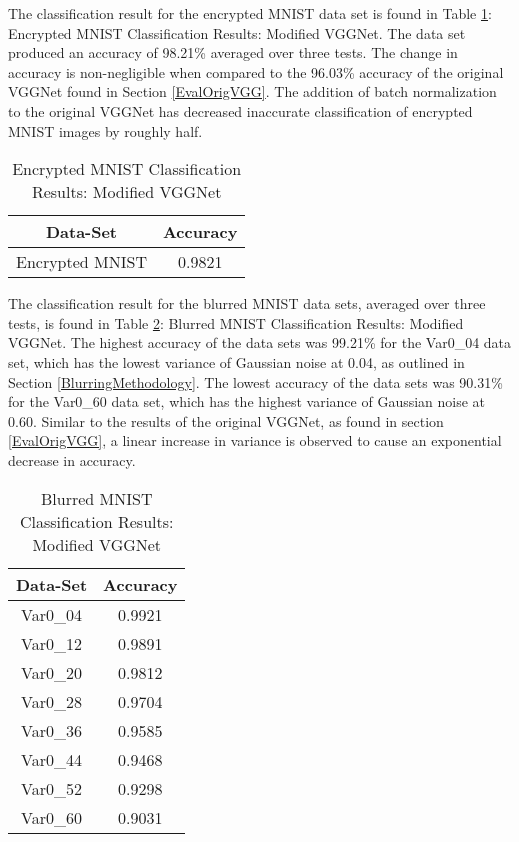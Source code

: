 \documentclass[12pt, titlepage]{article}
\begin{document}
\noindent The classification result for the encrypted MNIST data set is found in Table \ref{table:modVGG_Encryption}: Encrypted MNIST Classification Results: Modified VGGNet. The data set produced an accuracy of 98.21\% averaged over three tests. The change in accuracy is non-negligible when compared to the 96.03\% accuracy of the original VGGNet found in Section \ref{EvalOrigVGG}. The addition of batch normalization to the original VGGNet has decreased inaccurate classification of encrypted MNIST images by roughly half.\\

\begin{table}[!h]
	\begin{center}
		\begin{tabular}{| c | c |}
			\hline
			\textbf{Data-Set} & \textbf{Accuracy}\\
			\hline
			Encrypted MNIST & 0.9821\\
			\hline
		\end{tabular}
		\caption{Encrypted MNIST Classification Results: Modified VGGNet}
		\label{table:modVGG_Encryption}
	\end{center}
\end{table}

\noindent The classification result for the blurred MNIST data sets, averaged over three tests, is found in Table \ref{table:modVGG_Blurred}: Blurred MNIST Classification Results: Modified VGGNet. The highest accuracy of the data sets was 99.21\% for the Var0\_04 data set, which has the lowest variance of Gaussian noise at 0.04, as outlined in Section \ref{BlurringMethodology}. The lowest accuracy of the data sets was 90.31\% for the Var0\_60 data set, which has the highest variance of Gaussian noise at 0.60. Similar to the results of the original VGGNet, as found in section \ref{EvalOrigVGG}, a linear increase in variance is observed to cause an exponential decrease in accuracy.

\begin{table}[!h]
	\begin{center}
		\begin{tabular}{| c | c |}
			\hline
			\textbf{Data-Set} & \textbf{Accuracy}\\
			\hline
			Var0\_04 & 0.9921\\
			\hline
			Var0\_12 & 0.9891\\
			\hline
			Var0\_20 & 0.9812\\
			\hline
			Var0\_28 & 0.9704\\
			\hline
			Var0\_36 & 0.9585\\
			\hline
			Var0\_44 & 0.9468\\
			\hline
			Var0\_52 & 0.9298\\
			\hline
			Var0\_60 & 0.9031\\
			\hline
		\end{tabular}
		\caption{Blurred MNIST Classification Results: Modified VGGNet}
		\label{table:modVGG_Blurred}
	\end{center}
\end{table}
\end{document}
